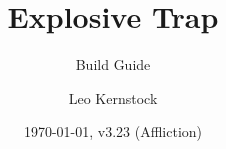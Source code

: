 \title{Explosive Trap}
\subtitle{Build Guide}
\author{Leo Kernstock}
\date{\today, v3.23 (Affliction)}
\maketitle
